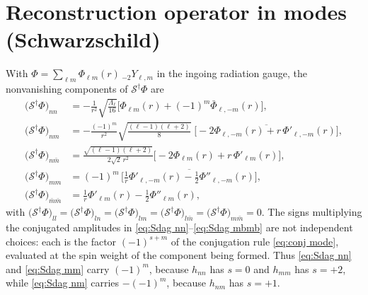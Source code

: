 \documentclass[preprint,aps,nofootinbib,a4paper,superscriptaddress,longbibliography,amsfonts, amssymb,amsmath,titlepage]{revtex4-1}
\numberwithin{equation}{section} %
\newcommand{\emm}{m}
\def\l{\ensuremath{\ell}}
\renewcommand{\S}{{\mathcal S}}
\def\LamL{\Lambda_{\l}}                             %
\newcommand{\sYY}[3]{{}_{#1}Y_{#2,#3}}
\begin{document}
\section{Reconstruction operator in modes (Schwarzschild)}
\label{app:Sdag}
With $\Phi=\sum_{\l\emm}\Phi_{\l\emm}(r)\,\sYY{-2}{\l}{\emm}$ in the ingoing
radiation gauge, the nonvanishing components of $\S^{\dagger}\Phi$ are
\begin{subequations}\label{eq:Sdag modes}
\begin{align}
\big(\S^{\dagger}\Phi\big)_{nn}
&= -\frac{1}{r^{2}}\sqrt{\frac{\LamL}{16}}
\Big[\Phi_{\l\emm}(r)+(-1)^{\emm}\bar\Phi_{\l,-\emm}(r)\Big],
\label{eq:Sdag nn}\\[4pt]
\big(\S^{\dagger}\Phi\big)_{nm}
&= -\frac{(-1)^{\emm}}{r^{2}}\sqrt{\frac{(\l-1)(\l+2)}{8}}\;
\overline{\Big[-2\Phi_{\l,-\emm}(r)+r\,\Phi'_{\l,-\emm}(r)\Big]},
\label{eq:Sdag nm}\\[4pt]
\big(\S^{\dagger}\Phi\big)_{n\bar m}
&= \frac{\sqrt{(\l-1)(\l+2)}}{2\sqrt2\,r^{2}}
\Big[-2\Phi_{\l\emm}(r)+r\,\Phi'_{\l\emm}(r)\Big],
\label{eq:Sdag nmb}\\[4pt]
\big(\S^{\dagger}\Phi\big)_{mm}
&= (-1)^{\emm}\,\overline{\Big[\frac{1}{r}\Phi'_{\l,-\emm}(r)
-\frac12\Phi''_{\l,-\emm}(r)\Big]},
\label{eq:Sdag mm}\\[4pt]
\big(\S^{\dagger}\Phi\big)_{\bar m\bar m}
&= \frac{1}{r}\Phi'_{\l\emm}(r)-\frac12\Phi''_{\l\emm}(r),
\label{eq:Sdag mbmb}
\end{align}
\end{subequations}
with
$\big(\S^{\dagger}\Phi\big)_{ll}=\big(\S^{\dagger}\Phi\big)_{ln}
=\big(\S^{\dagger}\Phi\big)_{lm}=\big(\S^{\dagger}\Phi\big)_{l\bar m}
=\big(\S^{\dagger}\Phi\big)_{m\bar m}=0$.
The signs multiplying the conjugated amplitudes in
\eqref{eq:Sdag nn}--\eqref{eq:Sdag mbmb} are not independent choices: each is
the factor $(-1)^{s+\emm}$ of the conjugation rule \eqref{eq:conj mode},
evaluated at the spin weight of the component being formed.  Thus
\eqref{eq:Sdag nn} and \eqref{eq:Sdag mm} carry $(-1)^{\emm}$, because
$h_{nn}$ has $s=0$ and $h_{mm}$ has $s=+2$, while \eqref{eq:Sdag nm} carries
$-(-1)^{\emm}$, because $h_{nm}$ has $s=+1$.
\end{document}
